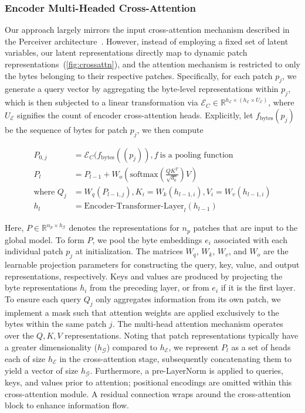\subsubsection{Encoder Multi-Headed Cross-Attention}
\label{sec:enc-cross-attn}
Our approach largely mirrors the input cross-attention mechanism described in the Perceiver architecture~\citep{jaegle2021perceiver}. However, instead of employing a fixed set of latent variables, our latent representations directly map to dynamic patch representations~(\autoref{fig:crossattn}), and the attention mechanism is restricted to only the bytes belonging to their respective patches. Specifically, for each patch $p_j$, we generate a query vector by aggregating the byte-level representations within $p_j$, which is then subjected to a linear transformation via $\mathcal{E}_{C} \in \mathbb{R}^{h_{\mathcal{E}} \times (h_{\mathcal{E}} \times U_{\mathcal{E}})}$, where $U_{\mathcal{E}}$ signifies the count of encoder cross-attention heads. Explicitly, let $f_{\text{bytes}}(p_j)$ be the sequence of bytes for patch $p_j$, we then compute

\begin{align}
P_{0,j} &= \mathcal{E}_{C}(f_\text{bytes}((p_j)), f~ \text{is a pooling function} \\
P_l &= P_{l-1} + W_o\left(\text{softmax}\left(\frac{QK^T}{\sqrt{d_k}}\right)V\right) \\
\text{where } Q_j &= W_q(P_{l-1,j}), K_i = W_k(h_{l-1,i}), V_i = W_v(h_{l-1,i}) \\
h_l &= \text{Encoder-Transformer-Layer}_l(h_{l-1})
\end{align}

Here, $P \in \mathbb{R}^{n_p \times h_{\mathcal{G}}}$ denotes the representations for $n_p$ patches that are input to the global model. To form $P$, we pool the byte embeddings $e_i$ associated with each individual patch $p_j$ at initialization. The matrices $W_q$, $W_k$, $W_v$, and $W_o$ are the learnable projection parameters for constructing the query, key, value, and output representations, respectively. Keys and values are produced by projecting the byte representations $h_i$ from the preceding layer, or from $e_i$ if it is the first layer. To ensure each query $Q_j$ only aggregates information from its own patch, we implement a mask such that attention weights are applied exclusively to the bytes within the same patch $j$. The multi-head attention mechanism operates over the $Q, K, V$ representations. Noting that patch representations typically have a greater dimensionality ($h_{\mathcal{G}}$) compared to $h_{\mathcal{E}}$, we represent $P_l$ as a set of heads each of size $h_{\mathcal{E}}$ in the cross-attention stage, subsequently concatenating them to yield a vector of size $h_{\mathcal{G}}$. Furthermore, a pre-LayerNorm is applied to queries, keys, and values prior to attention; positional encodings are omitted within this cross-attention module. A residual connection wraps around the cross-attention block to enhance information flow.

